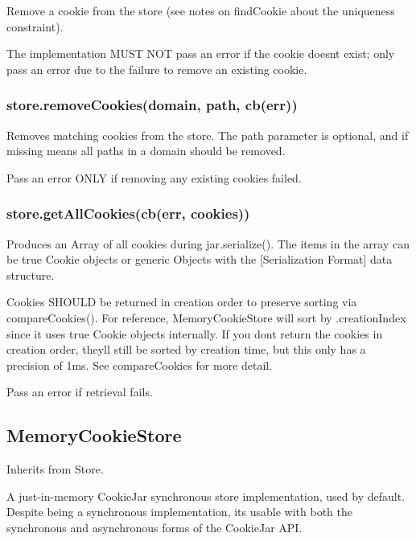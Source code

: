 Remove a cookie from the store (see notes on {\ttfamily find\+Cookie} about the uniqueness constraint).

The implementation M\+U\+ST N\+OT pass an error if the cookie doesn\textquotesingle{}t exist; only pass an error due to the failure to remove an existing cookie.

\subsubsection*{{\ttfamily store.\+remove\+Cookies(domain, path, cb(err))}}

Removes matching cookies from the store. The {\ttfamily path} parameter is optional, and if missing means all paths in a domain should be removed.

Pass an error O\+N\+LY if removing any existing cookies failed.

\subsubsection*{{\ttfamily store.\+get\+All\+Cookies(cb(err, cookies))}}

Produces an {\ttfamily Array} of all cookies during {\ttfamily jar.\+serialize()}. The items in the array can be true {\ttfamily Cookie} objects or generic {\ttfamily Object}s with the \mbox{[}Serialization Format\mbox{]} data structure.

Cookies S\+H\+O\+U\+LD be returned in creation order to preserve sorting via {\ttfamily compare\+Cookies()}. For reference, {\ttfamily Memory\+Cookie\+Store} will sort by {\ttfamily .creation\+Index} since it uses true {\ttfamily Cookie} objects internally. If you don\textquotesingle{}t return the cookies in creation order, they\textquotesingle{}ll still be sorted by creation time, but this only has a precision of 1ms. See {\ttfamily compare\+Cookies} for more detail.

Pass an error if retrieval fails.

\subsection*{Memory\+Cookie\+Store}

Inherits from {\ttfamily Store}.

A just-\/in-\/memory Cookie\+Jar synchronous store implementation, used by default. Despite being a synchronous implementation, it\textquotesingle{}s usable with both the synchronous and asynchronous forms of the {\ttfamily Cookie\+Jar} A\+PI.

